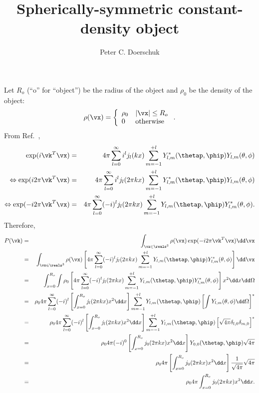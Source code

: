 \documentclass{article}
\begin{document}
\title{Spherically-symmetric constant-density object}
\author{Peter C. Doerschuk}
\maketitle
Let $R_o$ (``o'' for ``object'') be the radius of the object and $\rho_0$
be the density of the object:
\begin{equation}
\rho(\vx)
=
\left\{
\begin{array}{ll}
\rho_0 & |\vx|\le R_o \\
0 & \mbox{otherwise}
\end{array}
\right.
.
\end{equation}
From Ref.~\cite[Eq.~16.127]{Jackson1975},
\begin{eqnarray}
\exp(i\vk^T \vx)
&=&
4\pi
\sum_{l=0}^\infty
i^l
j_l(kx)
\sum_{m=-1}^{+l}
Y_{l,m}^\ast(\thetap,\phip)
Y_{l,m}(\theta,\phi)
\\
\Leftrightarrow
\exp(i 2\pi \vk^T \vx)
&=&
4\pi
\sum_{l=0}^\infty
i^l
j_l(2\pi kx)
\sum_{m=-1}^{+l}
Y_{l,m}^\ast(\thetap,\phip)
Y_{l,m}(\theta,\phi)
\\
\Leftrightarrow
\exp(-i 2\pi \vk^T \vx)
&=&
4\pi
\sum_{l=0}^\infty
(-i)^l
j_l(2\pi kx)
\sum_{m=-1}^{+l}
Y_{l,m}(\thetap,\phip)
Y_{l,m}^\ast(\theta,\phi)
.
\end{eqnarray}
Therefore,
\begin{eqnarray}
P(\vk)
&=&
\int_{\vx\in\reals^3}
\rho(\vx) \exp(-i 2\pi\vk^T \vx) \dd\vx
\\
&=&
\int_{\vx\in\reals^3}
\rho(\vx)
\left[
4\pi
\sum_{l=0}^\infty
(-i)^l
j_l(2\pi kx)
\sum_{m=-1}^{+l}
Y_{l,m}(\thetap,\phip)
Y_{l,m}^\ast(\theta,\phi)
\right]
\dd\vx
\\
&=&
\int_{x=0}^{R_o}
\int
\rho_0
\left[
4\pi
\sum_{l=0}^\infty
(-i)^l
j_l(2\pi kx)
\sum_{m=-1}^{+l}
Y_{l,m}(\thetap,\phip)
Y_{l,m}^\ast(\theta,\phi)
\right]
x^2 \dd x
\dd\Omega
\\
&=&
\rho_0
4\pi
\sum_{l=0}^\infty
(-i)^l
\left[
\int_{x=0}^{R_o}
j_l(2\pi kx)
x^2 \dd x
\right]
\sum_{m=-1}^{+l}
Y_{l,m}(\thetap,\phip)
\left[
\int
Y_{l,m}(\theta,\phi)
\dd\Omega
\right]^\ast
\\
&=&
\rho_0
4\pi
\sum_{l=0}^\infty
(-i)^l
\left[
\int_{x=0}^{R_o}
j_l(2\pi kx)
x^2 \dd x
\right]
\sum_{m=-1}^{+l}
Y_{l,m}(\thetap,\phip)
\left[
\sqrt{4\pi}\delta_{l,0}\delta_{m,0}
\right]^\ast
\\
&=&
\rho_0
4\pi
(-i)^0
\left[
\int_{x=0}^{R_o}
j_0(2\pi kx)
x^2 \dd x
\right]
Y_{0,0}(\thetap,\phip)
\sqrt{4\pi}
\\
&=&
\rho_0
4\pi
\left[
\int_{x=0}^{R_o}
j_0(2\pi kx)
x^2 \dd x
\right]
\frac{1}{\sqrt{4\pi}}
\sqrt{4\pi}
\\
&=&
\rho_0
4\pi
\int_{x=0}^{R_o}
j_0(2\pi kx)
x^2 \dd x
.
\end{eqnarray}
\end{document}
